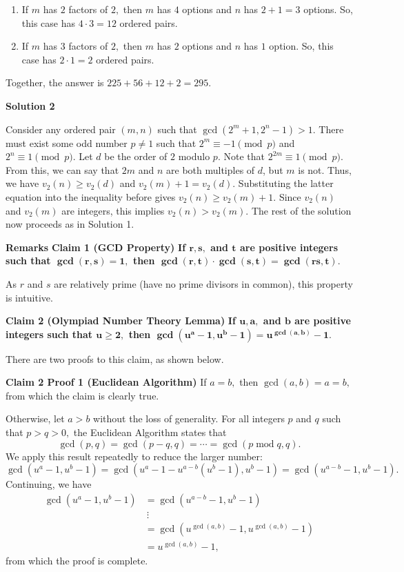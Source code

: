 \begin{enumerate}
\begin{enumerate}
        \item If $m$ has $2$ factors of $2,$ then $m$ has $4$ options and $n$ has $2+1=3$ options. So, this case has $4\cdot3=12$ ordered pairs.

        \item If $m$ has $3$ factors of $2,$ then $m$ has $2$ options and $n$ has $1$ option. So, this case has $2\cdot1=2$ ordered pairs.
            \end{enumerate}
            Together, the answer is $225+56+12+2=\boxed{295}.$




\textbf{Solution 2}

Consider any ordered pair $(m,n)$ such that $\gcd(2^m+1, 2^n-1) > 1$. There must exist some odd number $p\ne 1$ such that $2^m \equiv -1 \pmod{p}$ and $2^n \equiv 1 \pmod{p}$. Let $d$ be the order of $2$ modulo $p$. Note that $2^{2m} \equiv 1 \pmod{p}$. From this, we can say that $2m$ and $n$ are both multiples of $d$, but $m$ is not. Thus, we have $v_2(n) \ge v_2(d)$ and $v_2(m) + 1 = v_2(d)$.  Substituting the latter equation into the inequality before gives $v_2(n) \ge v_2(m)+1$. Since $v_2(n)$ and $v_2(m)$ are integers, this implies $v_2(n)>v_2(m)$. The rest of the solution now proceeds as in Solution 1.

 \textbf{Remarks} \textbf{Claim 1 (GCD Property)} \textbf{If $\boldsymbol{r,s,}$ and $\boldsymbol{t}$ are positive integers such that $\boldsymbol{\gcd(r,s)=1,}$ then $\boldsymbol{\gcd(r,t)\cdot\gcd(s,t)=\gcd(rs,t).}$}

 As $r$ and $s$ are relatively prime (have no prime divisors in common), this property is intuitive.

 \textbf{Claim 2 (Olympiad Number Theory Lemma)} \textbf{If $\boldsymbol{u,a,}$ and $\boldsymbol{b}$ are positive integers such that $\boldsymbol{u\geq2,}$ then $\boldsymbol{\gcd\left(u^a-1,u^b-1\right)=u^{\gcd(a,b)}-1.}$}

 There are two proofs to this claim, as shown below.

 \textbf{Claim 2 Proof 1 (Euclidean Algorithm)} If $a=b,$ then $\gcd(a,b)=a=b,$ from which the claim is clearly true.

 Otherwise, let $a>b$ without the loss of generality. For all integers $p$ and $q$ such that $p>q>0,$ the Euclidean Algorithm states that 
 \[\gcd(p,q)=\gcd(p-q,q)=\cdots=\gcd(p\operatorname{mod}q,q).\] We apply this result repeatedly to reduce the larger number: 
 \[\gcd\left(u^a-1,u^b-1\right)=\gcd\left(u^a-1-u^{a-b}\left(u^b-1\right),u^b-1\right)=\gcd\left(u^{a-b}-1,u^b-1\right).\]Continuing, we have
 \begin{align*} \gcd\left(u^a-1,u^b-1\right)&=\gcd\left(u^{a-b}-1,u^b-1\right) \\ & \ \vdots \\ &=\gcd\left(u^{\gcd(a,b)}-1,u^{\gcd(a,b)}-1\right) \\ &=u^{\gcd(a,b)}-1, \end{align*}
from which the proof is complete.


\end{enumerate}
